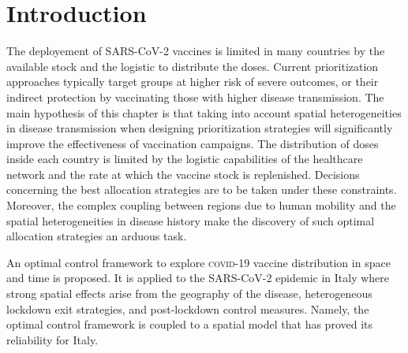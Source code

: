\section{Introduction}
The deployement of SARS-CoV-2 vaccines is limited in many countries by the available stock and the logistic to distribute the doses\cite[-2\baselineskip]{Khamsi:IfCoronavirusVaccine:2020,NationalAcademiesofSciencesEngineeringandMedicine:FrameworkEquitableAllocation:2020}. Current prioritization approaches typically target groups at higher risk of severe outcomes\cite{Spassiani:VaccinationCriteriaBased:2020, Matrajt:VaccineOptimizationCOVID19:2020}, or their indirect protection by vaccinating those with higher disease transmission\cite{%
Gallagher:IndirectBenefitsAre:2021,Tuite:AlternativeDoseAllocation:2021}. The main hypothesis of this chapter is that taking into account spatial heterogeneities in disease transmission when designing prioritization strategies will significantly improve the effectiveness of vaccination campaigns.
The distribution of doses inside each country is limited by the logistic capabilities of the healthcare network and the rate at which the vaccine stock is replenished. Decisions concerning the best allocation strategies are to be taken under these constraints. Moreover, the complex coupling between regions due to human mobility and the spatial heterogeneities in disease history make the discovery of such optimal allocation strategies an arduous task.

An optimal control framework to explore \textsc{covid}-19 vaccine distribution in space and time is proposed. It is applied to the SARS-CoV-2 epidemic in Italy where strong spatial effects arise from the geography of the disease, heterogeneous lockdown exit strategies, and post-lockdown control measures\cite[-4.5\baselineskip]{Marziano:RetrospectiveAnalysisItalian:2021}. Namely, the optimal control framework is coupled to a spatial model that has proved its reliability for Italy\cite{Gatto:SpreadDynamicsCOVID19:2020,Bertuzzo:GeographyCOVID19Spread:2020}. 

